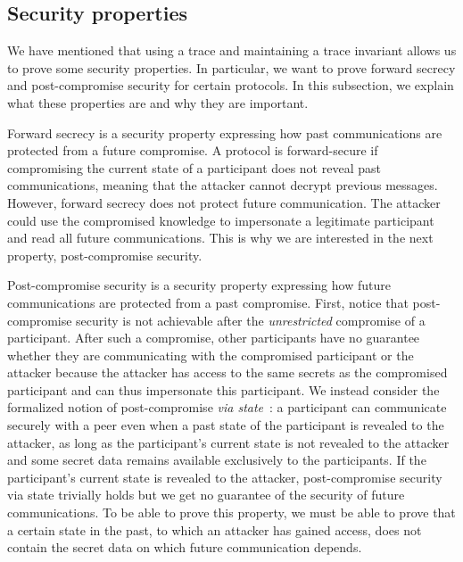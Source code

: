 \subsection{Security properties}
\label{sec:security-properties-def}

We have mentioned that using a trace and maintaining a trace invariant allows us to prove some security properties.
In particular, we want to prove forward secrecy and post-compromise security for certain protocols. In this subsection, we explain what these properties are and why they are important.

Forward secrecy is a security property expressing how past communications are protected from a future compromise.
A protocol is forward-secure if compromising the current state of a participant does not reveal past communications, meaning that the attacker cannot decrypt previous messages.
However, forward secrecy does not protect future communication. The attacker could use the compromised knowledge to impersonate a legitimate participant and read all future communications.
This is why we are interested in the next property, post-compromise security.

Post-compromise security is a security property expressing how future communications are protected from a past compromise.
First, notice that post-compromise security is not achievable after the \emph{unrestricted} compromise of a participant.
After such a compromise, other participants have no guarantee whether they are communicating with the compromised participant or the attacker because the attacker has access to the same secrets as the compromised participant and can thus impersonate this participant.
We instead consider the formalized notion of post-compromise \emph{via state}~\cite{7536374}:
a participant can communicate securely with a peer even when a past state of the participant is revealed to the attacker, as long as the participant's current state is not revealed to the attacker and some secret data remains available exclusively to the participants.
If the participant's current state is revealed to the attacker, post-compromise security via state trivially holds but we get no guarantee of the security of future communications.
To be able to prove this property, we must be able to prove that a certain state in the past, to which an attacker has gained access, does not contain the secret data on which future communication depends.

